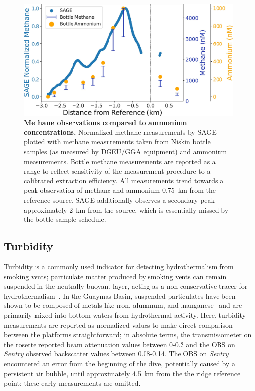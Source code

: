 \begin{figure}[h!]
    \centering
    \includegraphics[width=\columnwidth]{figures/chap3_bottle_norm.jpg}
    \caption[Methane observations compared to ammonium concentrations]{\textbf{Methane observations compared to ammonium concentrations.} Normalized methane measurements by SAGE plotted with methane measurements taken from Niskin bottle samples (as measured by DGEU/GGA equipment) and ammonium measurements. Bottle methane measurements are reported as a range to reflect sensitivity of the measurement procedure to a calibrated extraction efficiency. All measurements trend towards a peak observation of methane and ammonium \SI{0.75}{\kilo\meter} from the reference source. SAGE additionally observes a secondary peak approximately \SI{2}{\kilo\meter} from the source, which is essentially missed by the bottle sample schedule.}
    \label{fig:bottles}
\end{figure}


\subsection{Turbidity}
\label{sec:turbidity_results}
Turbidity is a commonly used indicator for detecting hydrothermalism from smoking vents; particulate matter produced by smoking vents can remain suspended in the neutrally buoyant layer, acting as a non-conservative tracer for hydrothermalism~\autocite{feely1992tracking}. In the Guaymas Basin, suspended particulates have been shown to be composed of metals like iron, aluminum, and manganese~\autocite{scholz2019shelf} and are primarily mixed into bottom waters from hydrothermal activity. Here, turbidity measurements are reported as normalized values to make direct comparison between the platforms straightforward; in absolute terms, the transmissometer on the rosette reported beam attenuation values between 0-0.2 and the OBS on \emph{Sentry} observed backscatter values between 0.08-0.14. The OBS on \emph{Sentry} encountered an error from the beginning of the dive, potentially caused by a persistent air bubble, until approximately \SI{4.5}{\kilo\meter} from the the ridge reference point; these early measurements are omitted. 

